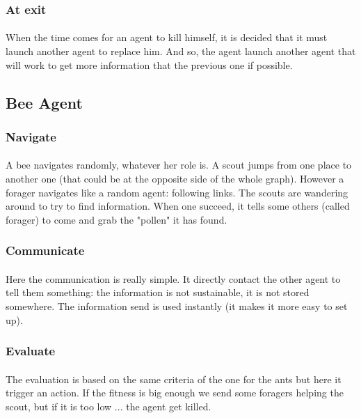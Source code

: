 \documentclass{article}
\begin{document}
		\subsubsection{At exit}
			\paragraph{}
			When the time comes for an agent to kill himself, it is decided that it must launch another agent to replace him.
			And so, the agent launch another agent that will work to get more information that the previous one if possible.
	\subsection{Bee Agent}
		\subsubsection{Navigate}
			\paragraph{}
			A bee navigates randomly, whatever her role is.
			A scout jumps from one place to another one (that could be at the opposite side of the whole graph).
			However a forager navigates like a random agent: following links.
			The scouts are wandering around to try to find information.
			When one succeed, it tells some others (called forager) to come and grab the "pollen" it has found.
		\subsubsection{Communicate}
			\paragraph{}
			Here the communication is really simple.
			It directly contact the other agent to tell them something: the information is not sustainable, it is not stored somewhere.
			The information send is used instantly (it makes it more easy to set up).
		\subsubsection{Evaluate}
			\paragraph{}
			The evaluation is based on the same criteria of the one for the ants but here it trigger an action.
			If the fitness is big enough we send some foragers helping the scout, but if it is too low ... the agent get killed.
\end{document}
